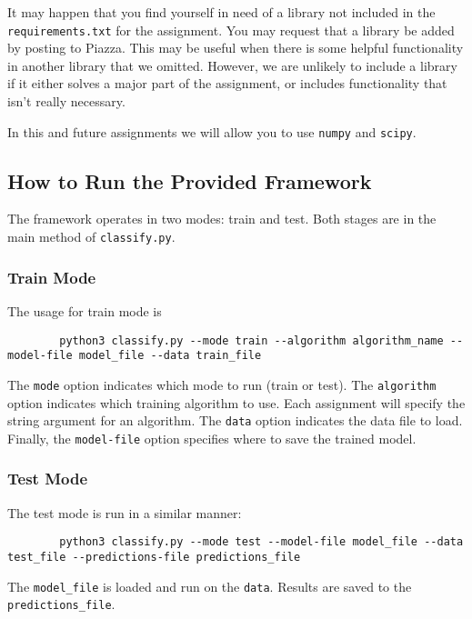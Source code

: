 \documentclass[11pt]{article}
\begin{document}
	It may happen that you find yourself in need of a library not included in the {\tt requirements.txt} for the assignment. You may request that a library be added by posting to Piazza. This may be useful when there is some helpful functionality in another library that we omitted. However, we are unlikely to include a library if it either solves a major part of the assignment, or includes functionality that isn't really necessary.
	
	In this and future assignments we will allow you to use {\tt numpy} and {\tt scipy}.
	
	\subsection{How to Run the Provided Framework}
	The framework operates in two modes: train and test. Both stages are in the main method of {\tt classify.py}.
	
	\subsubsection{Train Mode}
	The usage for train mode is
	\begin{footnotesize}
		\begin{verbatim}
		python3 classify.py --mode train --algorithm algorithm_name --model-file model_file --data train_file
		\end{verbatim}
	\end{footnotesize}
	The {\tt mode} option indicates which mode to run (train or test). The {\tt algorithm} option indicates which training algorithm to use. Each assignment will specify the string argument for an algorithm. The {\tt data} option indicates the data file to load. Finally, the {\tt model-file} option specifies where to save the trained model.
	
	\subsubsection{Test Mode}
	The test mode is run in a similar manner:
	\begin{footnotesize}
		\begin{verbatim}
		python3 classify.py --mode test --model-file model_file --data test_file --predictions-file predictions_file
		\end{verbatim}
	\end{footnotesize}
	The {\tt model\_file} is loaded and run on the {\tt data}. Results are saved to the {\tt predictions\_file}.
	
\end{document}
